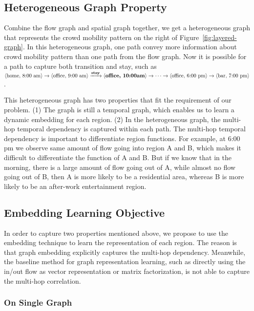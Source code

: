\subsection{Heterogeneous Graph Property}

Combine the flow graph and spatial graph together, we get a heterogeneous graph that represents the crowd mobility pattern on the right of Figure~\ref{fig:layered-graph}. In this heterogeneous graph, one path convey more information about crowd mobility pattern than one path from the flow graph. Now it is possible for a path to capture both transition and stay, such as $\langle \text{home, 8:00 am} \rangle \rightarrow \langle \text{office, 9:00 am} \rangle \xrightarrow{\text{\bf stay}} \langle \text{\bf office, 10:00am} \rangle \rightarrow \cdots \rightarrow \langle \text{office, 6:00 pm} \rangle \rightarrow \langle \text{bar, 7:00 pm} \rangle $.

This heterogeneous graph has two properties that fit the requirement of our problem. (1) The graph is still a temporal graph, which enables us to learn a dynamic embedding for each region. (2) In the heterogeneous graph, the multi-hop temporal dependency is captured within each path. The multi-hop temporal dependency is important to differentiate region functions. For example, at 6:00 pm we observe same amount of flow going into region A and B, which makes it difficult to differentiate the function of A and B. But if we know that in the morning, there is a large amount of flow going out of A, while almost no flow going out of B, then A is more likely to be a residential area, whereas B is more likely to be an after-work entertainment region.




\subsection{Embedding Learning Objective}

In order to capture two properties mentioned above, we propose to use the embedding technique to learn the representation of each region. The reason is that graph embedding explicitly captures the multi-hop dependency. Meanwhile, the baseline method for graph representation learning, such as directly using the in/out flow as vector representation or matrix factorization,  is not able to capture the multi-hop correlation.

\subsubsection{On Single Graph}

